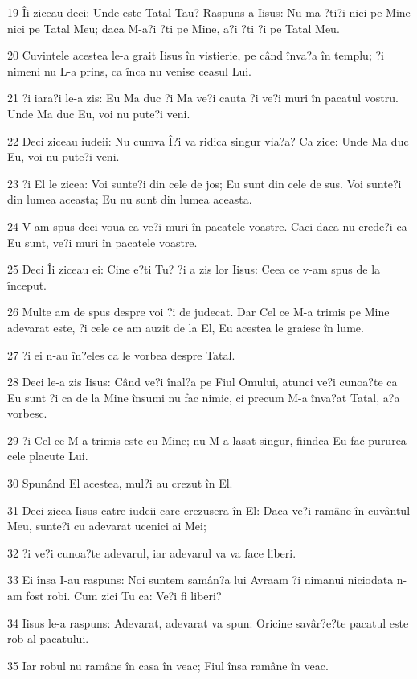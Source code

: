\par 19 Îi ziceau deci: Unde este Tatal Tau? Raspuns-a Iisus: Nu ma ?ti?i nici pe Mine nici pe Tatal Meu; daca M-a?i ?ti pe Mine, a?i ?ti ?i pe Tatal Meu.
\par 20 Cuvintele acestea le-a grait Iisus în vistierie, pe când înva?a în templu; ?i nimeni nu L-a prins, ca înca nu venise ceasul Lui.
\par 21 ?i iara?i le-a zis: Eu Ma duc ?i Ma ve?i cauta ?i ve?i muri în pacatul vostru. Unde Ma duc Eu, voi nu pute?i veni.
\par 22 Deci ziceau iudeii: Nu cumva Î?i va ridica singur via?a? Ca zice: Unde Ma duc Eu, voi nu pute?i veni.
\par 23 ?i El le zicea: Voi sunte?i din cele de jos; Eu sunt din cele de sus. Voi sunte?i din lumea aceasta; Eu nu sunt din lumea aceasta.
\par 24 V-am spus deci voua ca ve?i muri în pacatele voastre. Caci daca nu crede?i ca Eu sunt, ve?i muri în pacatele voastre.
\par 25 Deci Îi ziceau ei: Cine e?ti Tu? ?i a zis lor Iisus: Ceea ce v-am spus de la început.
\par 26 Multe am de spus despre voi ?i de judecat. Dar Cel ce M-a trimis pe Mine adevarat este, ?i cele ce am auzit de la El, Eu acestea le graiesc în lume.
\par 27 ?i ei n-au în?eles ca le vorbea despre Tatal.
\par 28 Deci le-a zis Iisus: Când ve?i înal?a pe Fiul Omului, atunci ve?i cunoa?te ca Eu sunt ?i ca de la Mine însumi nu fac nimic, ci precum M-a înva?at Tatal, a?a vorbesc.
\par 29 ?i Cel ce M-a trimis este cu Mine; nu M-a lasat singur, fiindca Eu fac pururea cele placute Lui.
\par 30 Spunând El acestea, mul?i au crezut în El.
\par 31 Deci zicea Iisus catre iudeii care crezusera în El: Daca ve?i ramâne în cuvântul Meu, sunte?i cu adevarat ucenici ai Mei;
\par 32 ?i ve?i cunoa?te adevarul, iar adevarul va va face liberi.
\par 33 Ei însa I-au raspuns: Noi suntem samân?a lui Avraam ?i nimanui niciodata n-am fost robi. Cum zici Tu ca: Ve?i fi liberi?
\par 34 Iisus le-a raspuns: Adevarat, adevarat va spun: Oricine savâr?e?te pacatul este rob al pacatului.
\par 35 Iar robul nu ramâne în casa în veac; Fiul însa ramâne în veac.
